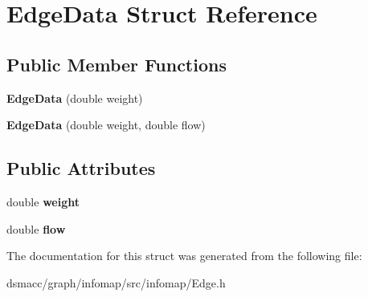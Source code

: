 \hypertarget{structEdgeData}{}\section{Edge\+Data Struct Reference}
\label{structEdgeData}
\subsection*{Public Member Functions}
\begin{DoxyCompactItemize}
\item 
\mbox{\label{structEdgeData_a8533ee19aa233edb0f956529cb21a12c}} 
{\bfseries Edge\+Data} (double weight)
\item 
\mbox{\label{structEdgeData_abc9b8be72c6f50c3cce206efee7b356f}} 
{\bfseries Edge\+Data} (double weight, double flow)
\end{DoxyCompactItemize}
\subsection*{Public Attributes}
\begin{DoxyCompactItemize}
\item 
\mbox{\label{structEdgeData_a7dcd90b6ae733455da8990d7d911f811}} 
double {\bfseries weight}
\item 
\mbox{\label{structEdgeData_a195386d418a1ad5624f289d0b9bc858d}} 
double {\bfseries flow}
\end{DoxyCompactItemize}


The documentation for this struct was generated from the following file\+:\begin{DoxyCompactItemize}
\item 
dsmacc/graph/infomap/src/infomap/Edge.\+h\end{DoxyCompactItemize}
